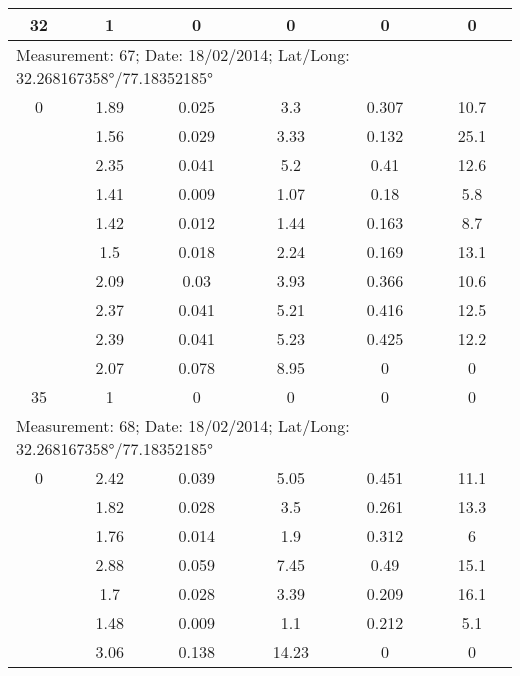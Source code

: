 \begin{longtable}{cccccc}
		32    & 1     & 0     & 0     & 0     & 0  \\ 
		\midrule
		\multicolumn{6}{l}{Measurement: 67; Date: 18/02/2014;
			Lat/Long: 32.268167358°/77.18352185°} \\		
		\midrule
		0     & 1.89  & 0.025 & 3.3   & 0.307 & 10.7 \\
		
		& 1.56  & 0.029 & 3.33  & 0.132 & 25.1 \\
		
		& 2.35  & 0.041 & 5.2   & 0.41  & 12.6 \\
		
		& 1.41  & 0.009 & 1.07  & 0.18  & 5.8 \\
		
		& 1.42  & 0.012 & 1.44  & 0.163 & 8.7 \\
		
		& 1.5   & 0.018 & 2.24  & 0.169 & 13.1 \\
		
		& 2.09  & 0.03  & 3.93  & 0.366 & 10.6 \\
		
		& 2.37  & 0.041 & 5.21  & 0.416 & 12.5 \\
		
		& 2.39  & 0.041 & 5.23  & 0.425 & 12.2 \\
		
		& 2.07  & 0.078 & 8.95  & 0     & 0 \\
		
		35    & 1     & 0     & 0     & 0     & 0 \\

		\multicolumn{6}{l}{Measurement: 68; Date: 18/02/2014;
			Lat/Long: 32.268167358°/77.18352185°} \\		
		\midrule
		0     & 2.42  & 0.039 & 5.05  & 0.451 & 11.1 \\
		
		& 1.82  & 0.028 & 3.5   & 0.261 & 13.3 \\
		
		& 1.76  & 0.014 & 1.9   & 0.312 & 6 \\
		
		& 2.88  & 0.059 & 7.45  & 0.49  & 15.1 \\
		
		& 1.7   & 0.028 & 3.39  & 0.209 & 16.1 \\
		
		& 1.48  & 0.009 & 1.1   & 0.212 & 5.1 \\
		
		& 3.06  & 0.138 & 14.23 & 0     & 0 \\
		

\end{longtable}
